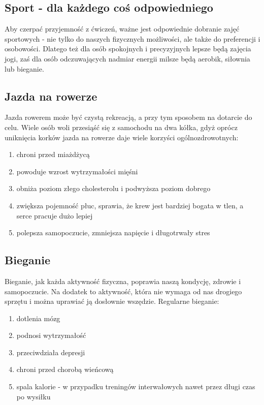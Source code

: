 \documentclass[12pt, letterpaper, titlepage]{article}
\begin{document}
\newpage
\begin{center}
\section*{Sport - dla każdego coś odpowiedniego}
\end{center}
Aby czerpać przyjemność z ćwiczeń, ważne jest odpowiednie dobranie zajęć sportowych - nie tylko do naszych fizycznych możliwości, ale także do preferencji i osobowości. Dlatego też dla osób spokojnych i precyzyjnych lepsze będą zajęcia jogi, zaś dla osób odczuwających nadmiar energii milsze będą aerobik, siłownia lub bieganie.
\newline
\subsection*{Jazda na rowerze}
Jazda rowerem może być czystą rekreacją, a przy tym sposobem na dotarcie do celu. Wiele osób woli przesiąść się z samochodu na dwa kółka, gdyż oprócz uniknięcia korków jazda na rowerze daje wiele korzyści ogólnozdrowotnych:
\begin{enumerate}[-]
\item chroni przed miażdżycą
\item powoduje wzrost wytrzymałości mięśni
\item obniża poziom złego cholesterolu i podwyższa poziom dobrego
\item zwiększa pojemność płuc, sprawia, że krew jest bardziej bogata w tlen, a serce pracuje dużo lepiej
\item polepsza samopoczucie, zmniejsza napięcie i długotrwały stres
\end{enumerate}
\subsection*{Bieganie}
Bieganie, jak każda aktywność fizyczna, poprawia naszą kondycję, zdrowie i samopoczucie. Na dodatek to aktywność, która nie wymaga od nas drogiego sprzętu i można uprawiać ją dosłownie wszędzie.
\newline
Regularne bieganie:
\begin{enumerate}[-]
\item dotlenia mózg
\item podnosi wytrzymałość
\item przeciwdziała depresji
\item chroni przed chorobą wieńcową
\item spala kalorie - w przypadku treningów interwałowych nawet przez długi czas po wysiłku
\end{enumerate}
\end{document}
